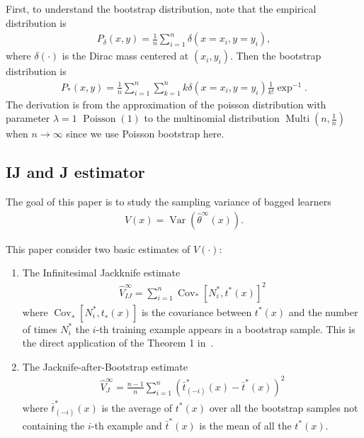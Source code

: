 \documentclass[11pt]{article}
\begin{document}
First, to understand the bootstrap distribution, note that the empirical distribution is \begin{align*}
	P_{\delta}(x, y)=\frac{1}{n} \sum_{i=1}^{n} \delta\left(x=x_{i}, y=y_{i}\right),
\end{align*}
where $\delta(\cdot)$ is the Dirac mass centered at $(x_i, y_i)$.
Then the bootstrap distribution is \begin{align*}
	P_{*}(x, y)=\frac{1}{n} \sum_{i=1}^{n} \sum_{k=1}^n k\delta\left(x=x_{i}, y=y_{i}\right) \frac{1}{k!}\exp^{-1}.
\end{align*}
The derivation is from the approximation of the poisson distribution with parameter $\lambda=1$ $\operatorname{Poisson}(1)$ to the multinomial distribution $\operatorname{Multi}(n,\frac{1}{n})$ when $n\rightarrow \infty$ since we use Poisson bootstrap here.


\subsection{IJ and J estimator}
The goal of this paper is to study the sampling variance of bagged learners
\begin{align*}
	V(x) = \operatorname{Var}(\hat{\theta}^{\infty}(x)).
\end{align*}

This paper consider two basic estimates of $V(\cdot)$:
\begin{enumerate}
	\item The Infinitesimal Jackknife estimate \begin{align*}
		\widehat{V}_{I J}^{\infty}=\sum_{i=1}^{n} \operatorname{Cov}_{*}\left[N_{i}^{*}, t^{*}(x)\right]^{2}
	\end{align*}
	where $\operatorname{Cov}_{∗}[N_i^{*}, t_{∗}(x)]$ is the covariance between $t^{*}(x)$ and the number of times $N_i^{*}$ the $i$-th training example appears in a bootstrap sample. This is the direct application of the Theorem 1 in~\cite{efron2012model}.
	\item The Jacknife-after-Bootstrap estimate \begin{align*}
		\widehat{V}_{J}^{\infty}=\frac{n-1}{n} \sum_{i=1}^{n}\left(\bar{t}_{(-i)}^{*}(x)-\bar{t}^{*}(x)\right)^{2}
	\end{align*}
	where  $\bar{t}_{(-i)}^{*}(x)$ is the average of $t^{*}(x)$ over all the bootstrap samples not containing the $i$-th example and $\bar{t}^{*}(x)$ is the mean of all the $t^{*}(x)$.
\end{enumerate}
\end{document}
